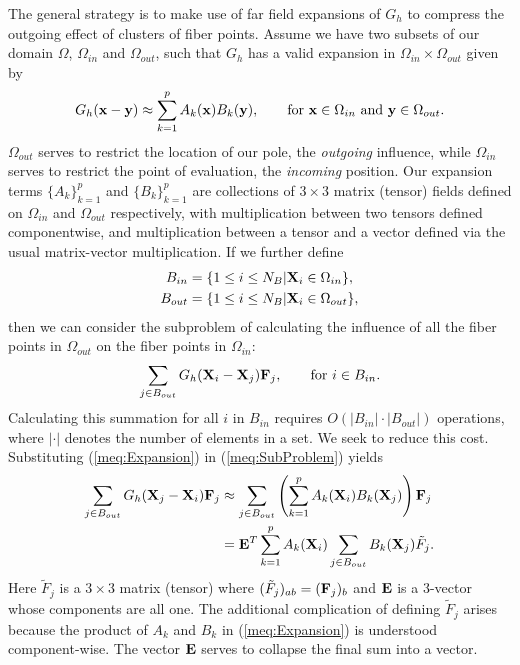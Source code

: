 The general strategy is to make use of far field expansions of $G_h$ to compress the outgoing effect of clusters of fiber points. Assume we have two subsets of our domain $\Omega$, $\Omega_{in}$ and $\Omega_{out}$, such that $G_h$ has a valid expansion in $\Omega_{in}\times \Omega_{out}$ given by
\begin{equation}
G_h(\mathbf{x}-\mathbf{y}) \approx \sum_{k=1}^{p}A_k(\mathbf{x})B_k(\mathbf{y}), \qquad \text{for $\mathbf{x}\in\Omega_{in}$ and  $\mathbf{y}\in\Omega_{out}$}.
\label{meq:Expansion}
\end{equation}
$\Omega_{out}$ serves to restrict the location of our pole, the \textit{outgoing} influence, while $\Omega_{in}$ serves to restrict the point of evaluation, the \textit{incoming} position.
Our expansion terms $\{A_k\}_{k=1}^p$ and $\{B_k\}_{k=1}^p$ are collections of $3\times 3$ matrix (tensor) fields defined on $\Omega_{in}$ and $\Omega_{out}$ respectively, with multiplication between two tensors defined componentwise, and multiplication between a tensor and a vector defined via the usual matrix-vector multiplication. If we further define
\begin{gather}
B_{in} = \{1 \leq i \leq N_B | \mathbf{X}_i \in \Omega_{in}\}, \\
B_{out} = \{1 \leq i \leq N_B | \mathbf{X}_i \in \Omega_{out}\},
\end{gather}
then we can consider the subproblem of calculating the influence of all the fiber points in $\Omega_{out}$ on the fiber points in $\Omega_{in}$:
\begin{equation}
\sum_{j\in B_{out}} G_h(\mathbf{X}_i - \mathbf{X}_j) \mathbf{F}_j, \qquad\text{for $i\in B_{in}$}.
\label{meq:SubProblem}
\end{equation}
Calculating this summation for all $i$ in $B_{in}$ requires $O(|B_{in}|\cdot |B_{out}|)$ operations, where $|\cdot|$ denotes the number of elements in a set. We seek to reduce this cost.
Substituting (\ref{meq:Expansion}) in (\ref{meq:SubProblem}) yields
\begin{eqnarray}
\sum_{j\in B_{out}} G_h(\mathbf{X}_j - \mathbf{X}_i) \mathbf{F}_j
&\approx \displaystyle\sum_{j\in B_{out}} \left( \sum_{k=1}^{p}A_k(\mathbf{X}_i)B_k(\mathbf{X}_j) \right)  \mathbf{F}_j \nonumber \\
&= \mathbf{E}^T\displaystyle\sum_{k=1}^{p}A_k(\mathbf{X}_i) \sum_{j\in B_{out}} B_k(\mathbf{X}_j) \tilde{F}_j.
\label{meq:SummingTrick}
\end{eqnarray}
Here $\tilde{F}_j$ is a $3\times 3$ matrix (tensor) where $(\tilde{F}_j)_{ab}=(\mathbf{F}_j)_b$ and $\mathbf{E}$ is a 3-vector whose components are all one. The additional complication of defining $\tilde{F}_j$ arises because the product of $A_k$ and $B_k$ in (\ref{meq:Expansion}) is understood  component-wise. The vector $\mathbf{E}$ serves to collapse the final sum into a vector.


